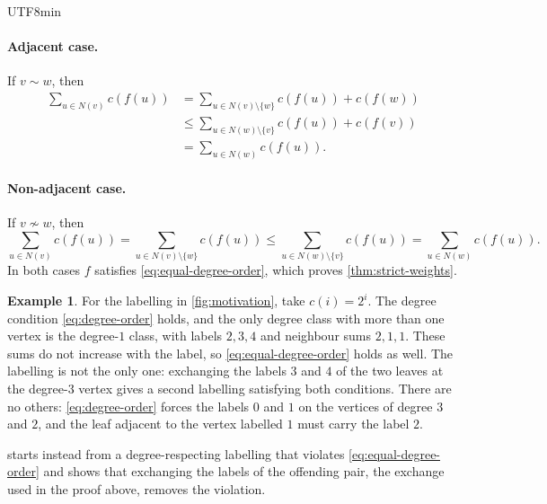 \documentclass[reqno]{amsart}
\theoremstyle{definition}
\newtheorem{example}[theorem]{Example}
\numberwithin{equation}{section}
\begin{document}
\begin{CJK*}{UTF8}{min}
\paragraph{Adjacent case.}
If \(v\sim w\), then
\[
  \begin{aligned}
  \sum_{u\in N(v)}c(f(u))
    &=\sum_{u\in N(v)\setminus\{w\}}c(f(u))+c(f(w))\\
    &\leq\sum_{u\in N(w)\setminus\{v\}}c(f(u))+c(f(v))\\
    &=\sum_{u\in N(w)}c(f(u)).
  \end{aligned}
\]

\paragraph{Non-adjacent case.}
If \(v\not\sim w\), then
\[
  \sum_{u\in N(v)}c(f(u))
  =\sum_{u\in N(v)\setminus\{w\}}c(f(u))
  \leq\sum_{u\in N(w)\setminus\{v\}}c(f(u))
  =\sum_{u\in N(w)}c(f(u)).
\]
In both cases \(f\) satisfies \eqref{eq:equal-degree-order}, which proves \cref{thm:strict-weights}.

\begin{example}\label{ex:swap}
For the labelling in \cref{fig:motivation}, take \(c(i)=2^i\). The degree
condition \eqref{eq:degree-order} holds, and the only degree class with more
than one vertex is the degree-\(1\) class, with labels \(2,3,4\) and neighbour
sums \(2,1,1\). These sums do not increase with the label, so
\eqref{eq:equal-degree-order} holds as well. The labelling is not the only one:
exchanging the labels \(3\) and \(4\) of the two leaves at the degree-\(3\)
vertex gives a second labelling satisfying both conditions. There are no
others: \eqref{eq:degree-order} forces the labels \(0\) and \(1\) on the
vertices of degree \(3\) and \(2\), and the leaf adjacent to the vertex
labelled \(1\) must carry the label \(2\).

 starts instead from a degree-respecting labelling that violates
\eqref{eq:equal-degree-order} and shows that exchanging the labels of the
offending pair, the exchange used in the proof above, removes the violation.
\end{example}


\end{CJK*}
\end{document}
